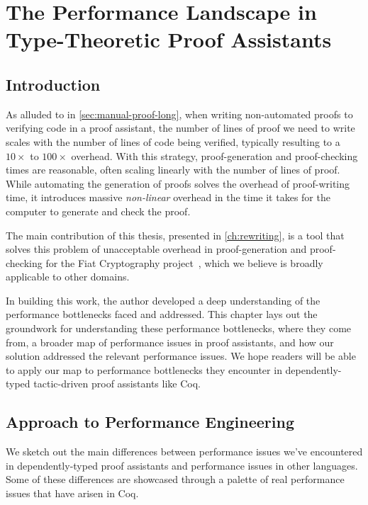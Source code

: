 \chapter{The Performance Landscape in Type-Theoretic Proof Assistants} \label{ch:perf-failures}

\section{Introduction}\label{sec:perf-failures:story}

As alluded to in \autoref{sec:manual-proof-long}, when writing non-automated proofs to verifying code in a proof assistant, the number of lines of proof we need to write scales with the number of lines of code being verified, typically resulting to a $10\times$ to $100\times$ overhead.
With this strategy, proof-generation and proof-checking times are reasonable, often scaling linearly with the number of lines of proof.
While automating the generation of proofs solves the overhead of proof-writing time, it introduces massive \emph{non-linear} overhead in the time it takes for the computer to generate and check the proof.

The main contribution of this thesis, presented in \autoref{ch:rewriting}, is a tool that solves this problem of unacceptable overhead in proof-generation and proof-checking for the Fiat Cryptography project~\cite{FiatCryptoSP19},  which we believe is broadly applicable to other domains.

In building this work, the author developed a deep understanding of the performance bottlenecks faced and addressed.
This chapter lays out the groundwork for understanding these performance bottlenecks, where they come from, a broader map of performance issues in proof assistants, and how our solution addressed the relevant performance issues.
We hope readers will be able to apply our map to performance bottlenecks they encounter in dependently-typed tactic-driven proof assistants like Coq.

\section{Approach to Performance Engineering}\label{sec:perf-failures:story}

We sketch out the main differences between performance issues we've encountered in dependently-typed proof assistants and performance issues in other languages.
Some of these differences are showcased through a palette of real performance issues that have arisen in Coq.

